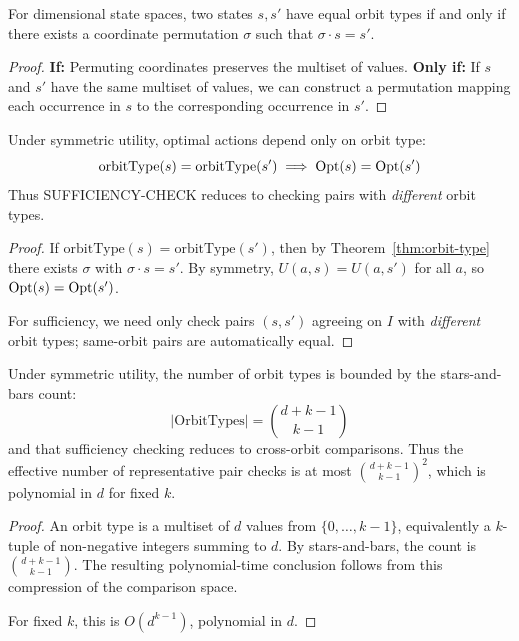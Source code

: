 \begin{theorem}\label{thm:orbit-type}
For dimensional state spaces, two states $s, s'$ have equal orbit types if and only if there exists a coordinate permutation $\sigma$ such that $\sigma \cdot s = s'$.
\end{theorem}


\begin{proof}
\textbf{If:} Permuting coordinates preserves the multiset of values.
\textbf{Only if:} If $s$ and $s'$ have the same multiset of values, we can construct a permutation mapping each occurrence in $s$ to the corresponding occurrence in $s'$.
\end{proof}

\begin{theorem}\label{thm:symmetric-reduction}
Under symmetric utility, optimal actions depend only on orbit type:
\[
\text{orbitType}(s) = \text{orbitType}(s') \implies \mathrm{Opt}(s) = \mathrm{Opt}(s')
\]
Thus SUFFICIENCY-CHECK reduces to checking pairs with \emph{different} orbit types.
\end{theorem}


\begin{proof}
If $\text{orbitType}(s) = \text{orbitType}(s')$, then by Theorem~\ref{thm:orbit-type} there exists $\sigma$ with $\sigma \cdot s = s'$. By symmetry, $U(a, s) = U(a, s')$ for all $a$, so $\mathrm{Opt}(s) = \mathrm{Opt}(s')$.

For sufficiency, we need only check pairs $(s, s')$ agreeing on $I$ with \emph{different} orbit types; same-orbit pairs are automatically equal.
\end{proof}

\begin{theorem}\label{thm:symmetric-complexity}
Under symmetric utility, the number of orbit types is bounded by the stars-and-bars count:
\[
|\text{OrbitTypes}| = \binom{d + k - 1}{k - 1}
\]
and that sufficiency checking reduces to cross-orbit comparisons. Thus the effective number of representative pair checks is at most $\binom{d + k - 1}{k - 1}^2$, which is polynomial in $d$ for fixed $k$.
\end{theorem}


\begin{proof}
An orbit type is a multiset of $d$ values from $\{0, \ldots, k-1\}$, equivalently a $k$-tuple of non-negative integers summing to $d$. By stars-and-bars, the count is $\binom{d + k - 1}{k - 1}$. The resulting polynomial-time conclusion follows from this compression of the comparison space.

For fixed $k$, this is $O(d^{k-1})$, polynomial in $d$.
\end{proof}

